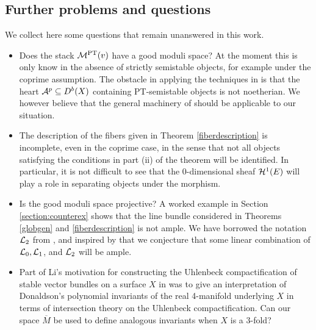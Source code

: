 \subsection*{Further problems and questions}
We collect here some questions that remain unanswered in this work.
\begin{itemize}
    \item Does the stack $\mathcal{M}^{\mathrm{PT}}(v)$ have a good moduli space? At the moment this is only know in the absence of strictly semistable objects, for example under the coprime assumption. The obstacle in applying the techniques in \cite[section 7]{AHLH} is that the heart $\mathcal{A}^p \subseteq D^b(X)$ containing PT-semistable objects is not noetherian. We however believe that the general machinery of \cite{AHLH} should be applicable to our situation.
    
    \item The description of the fibers given in Theorem \ref{fiberdescription} is incomplete, even in the coprime case, in the sense that not all objects satisfying the conditions in part (ii) of the theorem will be identified. In particular, it is not difficult to see that the 0-dimensional sheaf $\mathcal{H}^1(E)$ will play a role in separating objects under the morphism.
    
    \item Is the good moduli space projective? A worked example in Section \ref{section:counterex} shows that the line bundle considered in Theorems \ref{globgen} and \ref{fiberdescription} is not ample. We have borrowed the notation $\mathcal{L}_2$ from \cite[Chapter 8]{HL}, and inspired by that we conjecture that some linear combination of $\mathcal{L}_0, \mathcal{L}_1$, and $\mathcal{L}_2$ will be ample.
    
    \item Part of Li's motivation for constructing the Uhlenbeck compactification of stable vector bundles on a surface $X$ in \cite{li} was to give an interpretation of Donaldson's polynomial invariants of the real 4-manifold underlying $X$ in terms of intersection theory on the Uhlenbeck compactification. Can our space $\overline{M}$ be used to define analogous invariants when $X$ is a 3-fold?
\end{itemize}









